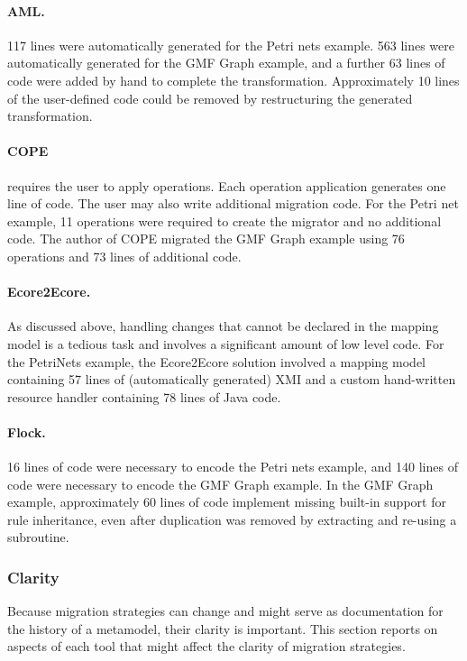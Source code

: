 \paragraph{AML.} 117 lines were automatically generated for the Petri nets example. 563 lines were automatically generated for the GMF Graph example, and a further 63 lines of code were added by hand to complete the transformation. Approximately 10 lines of the user-defined code could be removed by restructuring the generated transformation. 

\paragraph{COPE} requires the user to apply operations. Each operation application generates one line of code. The user may also write additional migration code. For the Petri net example, 11 operations were required to create the migrator and no additional code. The author of COPE migrated the GMF Graph example using 76 operations and 73 lines of additional code.

\paragraph{Ecore2Ecore.} As discussed above, handling changes that cannot be declared in the mapping model is a tedious task and involves a significant amount of low level code. For the PetriNets example, the Ecore2Ecore solution involved a mapping model containing 57 lines of (automatically generated) XMI and a custom hand-written resource handler containing 78 lines of Java code. 

\paragraph{Flock.} 16 lines of code were necessary to encode the Petri nets example, and 140 lines of code were necessary to encode the GMF Graph example.
In the GMF Graph example, approximately 60 lines of code implement missing built-in support for rule inheritance, even after duplication was removed by extracting and re-using a subroutine.


\subsubsection{Clarity}
Because migration strategies can change and might serve as documentation for the history of a metamodel, their clarity is important. This section reports on aspects of each tool that might affect the clarity of migration strategies.

